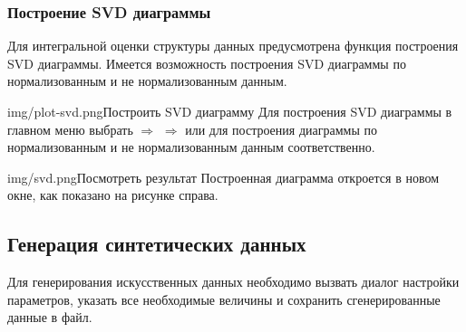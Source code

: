 \documentclass[12pt,tikz]{instruction}
\begin{document}
\newpage
\subsubsection{Построение SVD диаграммы}
\label{subsubsec:svd}
Для интегральной оценки структуры данных предусмотрена функция построения SVD диаграммы. Имеется возможность построения SVD диаграммы по нормализованным и не нормализованным данным.
\begin{steps}
	\begin{ist}{img/plot-svd.png}{Построить SVD диаграмму}
		Для построения SVD диаграммы в главном меню выбрать  $\Rightarrow$  $\Rightarrow$  или  для построения диаграммы по нормализованным и не нормализованным данным соответственно.
	\end{ist}

	\begin{ist}{img/svd.png}{Посмотреть результат}
		Построенная диаграмма откроется в новом окне, как показано на рисунке справа.\vspace{6.5cm}
	\end{ist}
\end{steps}

\subsection{Генерация синтетических данных}
\label{subsec:generation}
Для генерирования искусственных данных необходимо вызвать диалог настройки параметров, указать все необходимые величины и сохранить сгенерированные данные в файл.
\end{document}
